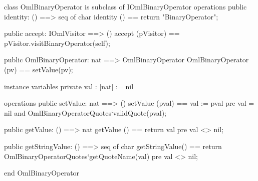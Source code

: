 \begin{vdm_al}
class OmlBinaryOperator is subclass of IOmlBinaryOperator
operations
  public identity: () ==> seq of char
  identity () == return "BinaryOperator";

  public accept: IOmlVisitor ==> ()
  accept (pVisitor) == pVisitor.visitBinaryOperator(self);

  public OmlBinaryOperator: nat ==> OmlBinaryOperator
  OmlBinaryOperator (pv) == setValue(pv);

instance variables
  private val : [nat] := nil

operations
  public setValue: nat ==> ()
  setValue (pval) == val := pval
    pre val = nil and OmlBinaryOperatorQuotes`validQuote(pval);

  public getValue: () ==> nat
  getValue () == return val
    pre val <> nil;

  public getStringValue: () ==> seq of char
  getStringValue() == return OmlBinaryOperatorQuotes`getQuoteName(val)
    pre val <> nil;

end OmlBinaryOperator
\end{vdm_al}
